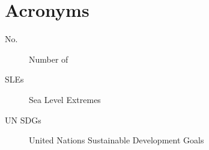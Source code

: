 
\chapter{Acronyms}
\begin{description}
\item[No.] Number of
\item[SLEs] Sea Level Extremes
\item [UN SDGs] United Nations Sustainable Development Goals 
\end{description}